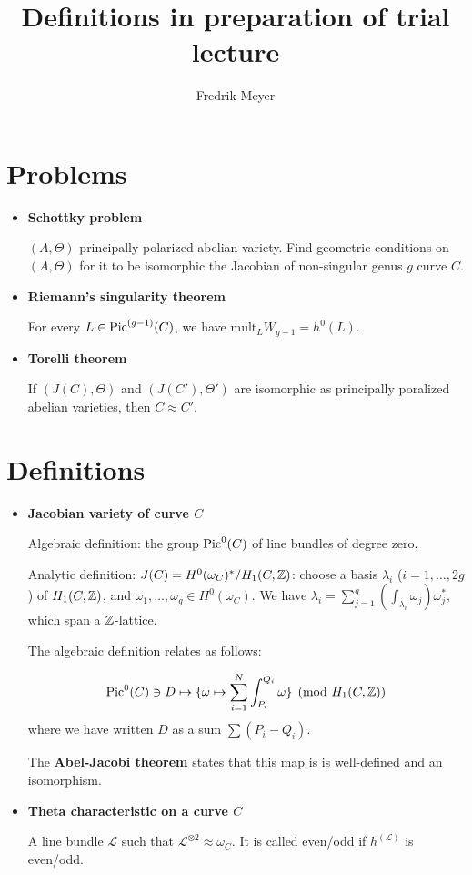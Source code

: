 \documentclass[11pt, english]{article}
\title{Definitions in preparation of trial lecture}
\author{Fredrik Meyer}
\date{}
\begin{document}
  
\maketitle

\section{Problems}

\begin{itemize}
	\item \textbf{Schottky problem}

	$(A,\Theta)$ principally polarized abelian variety. Find geometric conditions on $(A,\Theta)$ for it to be isomorphic the Jacobian of non-singular genus $g$ curve $C$.
	\item \textbf{Riemann's singularity theorem}

	For every $L \in \operatorname{Pic}^{(g-1)}(C)$, we have $\mathrm{mult}_L W_{g-1} = h^0(L)$.
	\item \textbf{Torelli theorem}

	If $(J(C), \Theta)$ and $(J(C'),\Theta')$ are isomorphic as principally poralized abelian varieties, then $C \approx C'$.
\end{itemize}

\section{Definitions}

\begin{itemize}
	\item \textbf{Jacobian variety of curve $C$}

	Algebraic definition: the group $\operatorname{Pic}^0 (C)$ of line bundles of degree zero.

	Analytic definition: $J(C) = H^0(\omega_C)^\ast / H_1(C,\mathbb{Z})$: choose a basis $\lambda_i$ ($i=1,\ldots,2g$) of $H_1(C,\mathbb{Z})$, and $\omega_1, \ldots,\omega_g \in H^0(\omega_C)$. We have $\lambda_i = \sum_{j=1}^g (\int_{\lambda_i} \omega_j)\omega_j^\ast$, which span a $\mathbb{Z}$-lattice.

	The algebraic definition relates as follows:

	$$
	\operatorname{Pic}^0(C) \ni D \mapsto \{ \omega \mapsto \sum_{i=1}^N \int_{P_i}^{Q_i} \omega \} \pmod{H_1(C,\mathbb{Z})}
	$$
	where we have written $D$ as a sum $\sum (P_i-Q_i)$.

	The \textbf{Abel-Jacobi theorem} states that this map is is well-defined and an isomorphism.
	\item \textbf{Theta characteristic on a curve $C$}

	A line bundle $\mathcal L$ such that $\mathcal L^{\otimes 2} \approx \omega_C$. It is called even/odd if $h^(\mathcal L)$ is even/odd.
\end{itemize}
\end{document}
